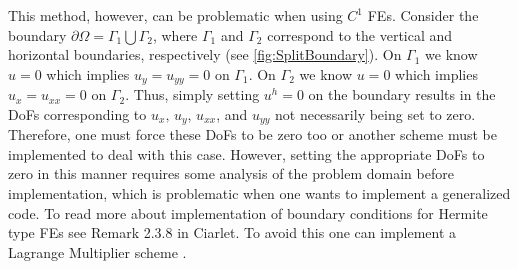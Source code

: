 This method, however, can be problematic when using $C^1$ FEs. Consider the
boundary $\partial \Omega = \Gamma_1 \bigcup \Gamma_2$, where $\Gamma_1$ and
$\Gamma_2$ correspond to the vertical and horizontal boundaries, respectively
(see \autoref{fig:SplitBoundary}).  On $\Gamma_1$ we know $u=0$ which implies
$u_y = u_{yy} = 0$ on $\Gamma_1$.  On $\Gamma_2$ we know $u=0$ which implies
$u_x = u_{xx} = 0$ on $\Gamma_2$. Thus, simply setting $u^h = 0$ on the boundary
results in the DoFs corresponding to $u_x,\,u_y,\,u_{xx}$, and $u_{yy}$ not
necessarily being set to zero. Therefore, one must force these DoFs to be zero
too or another scheme must be implemented to deal with this case. However,
setting the appropriate DoFs to zero in this manner requires some analysis of
the problem domain before implementation, which is problematic when one wants to
implement a generalized code. To read more about implementation of boundary
conditions for Hermite type FEs see Remark 2.3.8 in Ciarlet\cite{Ciarlet}. To
avoid this one can implement a Lagrange Multiplier scheme
\cite{Babuska1973,Barbosa1991,Barbosa1992,Bramble1981,Pitkaranta1981}.



